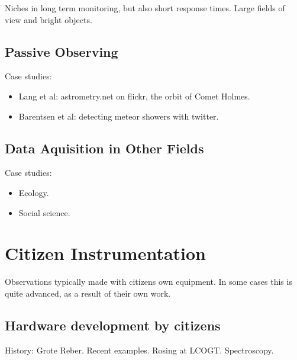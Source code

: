 \documentclass{ar2e}
\begin{document}
Niches in long term monitoring, but also short response times.
Large fields of view and bright objects.


\subsection{Passive Observing}
\label{sec:obs:passive}

Case studies:
\begin{itemize}
\item Lang et al: astrometry.net on flickr, the orbit of Comet Holmes.
\item Barentsen et al: detecting meteor showers with twitter.
\end{itemize}


\subsection{Data Aquisition in Other Fields}
\label{sec:obs:non-astro}

Case studies:
\begin{itemize}
\item Ecology.
\item Social science.
\end{itemize}



\section{Citizen Instrumentation}
\label{sec:instr}

Observations typically made with citizens own equipment. In some cases this is
quite advanced, as a result of their own work. 


\subsection{Hardware development by citizens}
\label{sec:instr:hardware}

History: Grote Reber. Recent examples. Rosing at LCOGT. Spectroscopy.
\end{document}
